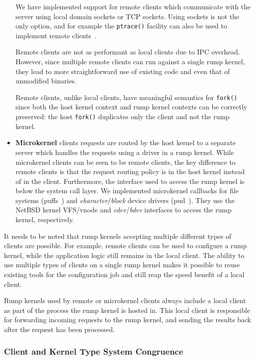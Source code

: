 \begin{itemize}
	We have implemented support for remote clients which
	communicate with the server using local domain sockets or TCP
	sockets.  Using sockets is not the only option, and for example
	the \texttt{ptrace()} facility can also be used to implement
	remote clients~\cite{dike:uml,gardenghi:viewos}.

	Remote clients are not as performant as local clients due to
	IPC overhead.
	However, since multiple remote clients can run against a
	single rump kernel, they lead to more straightforward use
	of existing code and even that of unmodified binaries.

	Remote clients, unlike local clients, have meaningful semantics
	for \texttt{fork()} since both the host kernel context and
	rump kernel contexts can be correctly preserved: the host
	\texttt{fork()} duplicates only the client and not the rump
	kernel.

\item   \textbf{Microkernel} clients requests are routed by the host kernel to
	a separate server which handles the requests using a driver in a
	rump kernel.  While microkernel clients can be seen to be remote
	clients, the key difference to remote clients is that the request
	routing policy is in the host kernel instead of in the client.
	Furthermore, the interface used to access the rump kernel
	is below the system call layer.  We implemented microkernel
	callbacks for file systems (puffs~\cite{kantee:puffs})
	and \textit{character}/\textit{block} device drivers
	(pud~\cite{man4:pud}).	They use the NetBSD kernel VFS/vnode
	and \textit{cdev}/\textit{bdev} interfaces to access the rump
	kernel, respectively.
\end{itemize}

It needs to be noted that rump kernels accepting multiple different types
of clients are possible.  For example, remote clients can be used to
configure a rump kernel, while the application logic still remains in
the local client.  The ability to use multiple types of clients on a
single rump kernel makes it possible to reuse existing tools for
the configuration job and still reap the speed benefit of a local client.

Rump kernels used by remote or microkernel clients always include
a local client as part of the process the rump kernel is hosted in.
This local client is responsible for forwarding incoming requests to
the rump kernel, and sending the results back after the request has
been processed.

\subsubsection{Client and Kernel Type System Congruence}

